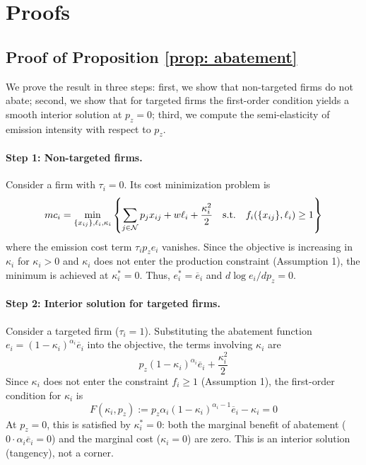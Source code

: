 
\section{Proofs}\label{app:proofs}


\subsection{Proof of Proposition \ref{prop: abatement}}

We prove the result in three steps: first, we show that non-targeted firms do not abate; second, we show that for targeted firms the first-order condition yields a smooth interior solution at $p_z = 0$; third, we compute the semi-elasticity of emission intensity with respect to $p_z$.

\paragraph{Step 1: Non-targeted firms.} Consider a firm with $\tau_i = 0$. Its cost minimization problem is
\begin{equation*}
    mc_i = \min_{\{x_{ij}\}, \ell_i, \kappa_i} \left\{ \sum_{j \in \mathcal{N}} p_j x_{ij} + w\ell_i + \frac{\kappa_i^2}{2} \quad \text{s.t.} \quad f_i(\{x_{ij}\}, \ell_i) \geq 1 \right\}
\end{equation*}
where the emission cost term $\tau_i p_z e_i$ vanishes. Since the objective is increasing in $\kappa_i$ for $\kappa_i > 0$ and $\kappa_i$ does not enter the production constraint (Assumption 1), the minimum is achieved at $\kappa_i^* = 0$. Thus, $e_i^* = \overline{e}_i$ and $d \log e_i / d p_z = 0$.

\paragraph{Step 2: Interior solution for targeted firms.} Consider a targeted firm ($\tau_i = 1$). Substituting the abatement function $e_i = (1-\kappa_i)^{\alpha_i}\overline{e}_i$ into the objective, the terms involving $\kappa_i$ are
\begin{equation*}
    p_z (1-\kappa_i)^{\alpha_i}\overline{e}_i + \frac{\kappa_i^2}{2}
\end{equation*}
Since $\kappa_i$ does not enter the constraint $f_i \geq 1$ (Assumption 1), the first-order condition for $\kappa_i$ is
\begin{equation}
    \label{eq: foc kappa}
    F(\kappa_i, p_z) := p_z \alpha_i (1-\kappa_i)^{\alpha_i - 1}\overline{e}_i - \kappa_i = 0
\end{equation}
At $p_z = 0$, this is satisfied by $\kappa_i^* = 0$: both the marginal benefit of abatement ($0 \cdot \alpha_i \overline{e}_i = 0$) and the marginal cost ($\kappa_i = 0$) are zero. This is an interior solution (tangency), not a corner.

